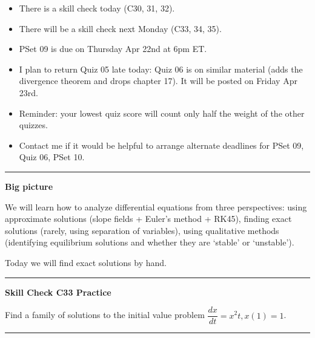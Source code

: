 \documentclass[12pt,letterpaper,noanswers]{exam}
\begin{document}
 \pdfpageheight 11in 
  \pdfpagewidth 8.5in





\begin{itemize}
\itemsep0em
\item There is a skill check today (C30, 31, 32).
\item There will be a skill check next Monday (C33, 34, 35).
\item PSet 09 is due on Thursday Apr 22nd at 6pm ET.
\item I plan to return Quiz 05 late today: Quiz 06 is on similar material (adds the divergence theorem and drops chapter 17).  It will be posted on Friday Apr 23rd.
\item Reminder: your lowest quiz score will count only half the weight of the other quizzes.
\item Contact me if it would be helpful to arrange alternate deadlines for PSet 09, Quiz 06, PSet 10.
\end{itemize}

\hrule
\vspace{0.2cm}


\noindent\textbf{Big picture}

We will learn how to analyze differential equations from three perspectives: using approximate solutions (slope fields + Euler's method + RK45), finding exact solutions (rarely, using separation of variables), using qualitative methods (identifying equilibrium solutions and whether they are `stable' or `unstable').

Today we will find exact solutions by hand.

\vspace{0.2cm}
\hrule
\vspace{0.2cm}

\noindent\textbf{Skill Check C33 Practice}

\begin{questions}
\item Find a family of solutions to the initial value problem $\dfrac{dx}{dt} = x^2t, x(1) = 1$.
\end{questions}

\vspace{0.2cm}
\hrule
\vspace{0.2cm}
\end{document}
